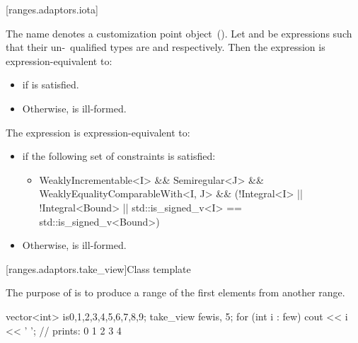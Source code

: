 [ranges.adaptors.iota]{}

\pnum
The name  denotes a customization point object~().
Let  and  be expressions such that their un-\cv\ qualified types
are  and  respectively. Then the expression 
is expression-equivalent to:

\begin{itemize}
\item {} if  is satisfied.
\item Otherwise,  is ill-formed.
\end{itemize}

\pnum
The expression  is expression-equivalent to:

\begin{itemize}
\item {} if the following set of constraints
is satisfied:
\begin{itemize}
\item \begin{codeblock}
WeaklyIncrementable<I> && Semiregular<J> &&
WeaklyEqualityComparableWith<I, J> &&
(!Integral<I> || !Integral<Bound> || std::is_signed_v<I> == std::is_signed_v<Bound>)
\end{codeblock}
\end{itemize}
\item Otherwise,  is ill-formed.
\end{itemize}

[ranges.adaptors.take_view]{Class template }

\pnum
The purpose of  is to produce a range of the first
 elements from another range.

\pnum
\enterexample
\begin{codeblock}
vector<int> is{0,1,2,3,4,5,6,7,8,9};
take_view few{is, 5};
for (int i : few)
  cout << i << ' '; // prints: 0 1 2 3 4
\end{codeblock}
\exitexample

